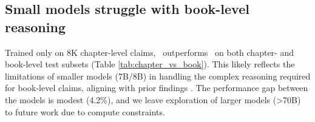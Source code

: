 


\subsection{Small models struggle with book-level reasoning} 
\label{subsection:chap-book-ft}
Trained only on 8K chapter-level claims, \prolongftchapter\ outperforms \prolongftbook\ on both chapter- and book-level test subsets (Table \ref{tab:chapter_vs_book}). This likely reflects the limitations of smaller models (7B/8B) in handling the complex reasoning required for book-level claims, aligning with prior findings \cite{qi2024quantifyinggeneralizationcomplexitylarge}. The performance gap between the models is modest (4.2\%), and we leave exploration of larger models (>70B) to future work due to compute constraints.


